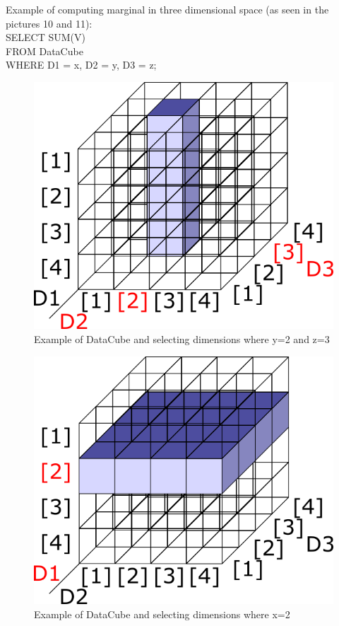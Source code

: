 Example of computing marginal in three dimensional space (as seen in the pictures 10 and 11):\\
SELECT SUM(V) \\
FROM DataCube \\
WHERE D1 = x, D2 = y, D3 = z;\\
\begin{figure}
\centering
\includegraphics[scale=0.5]{marg1d.png}
\caption{Example of DataCube and selecting dimensions where y=2 and z=3}
\end{figure}
\begin{figure}
\centering
\includegraphics[scale=0.5]{marg2d.png}
\caption{Example of DataCube and selecting dimensions where x=2}
\end{figure}


